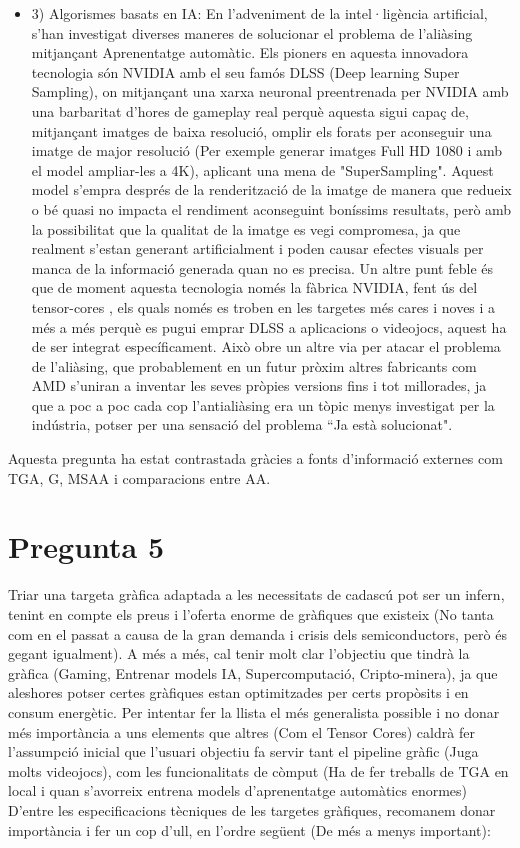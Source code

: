 \documentclass[12pt]{article}
\begin{document}
\begin{itemize}
    \item 3) Algorismes basats en IA: En l'adveniment de la intel·ligència artificial, s'han investigat diverses maneres de solucionar el problema de l'aliàsing mitjançant Aprenentatge automàtic. Els pioners en aquesta innovadora tecnologia són NVIDIA amb el seu famós DLSS\cite{nvidia_dlss} (Deep learning Super Sampling), on mitjançant una xarxa neuronal preentrenada per NVIDIA amb una barbaritat d'hores de gameplay real perquè aquesta sigui capaç de, mitjançant imatges de baixa resolució, omplir els forats per aconseguir una imatge de major resolució (Per exemple generar imatges Full HD 1080 i amb el model ampliar-les a 4K), aplicant una mena de "SuperSampling". Aquest model s'empra després de la renderització de la imatge de manera que redueix o bé quasi no impacta el rendiment aconseguint boníssims resultats, però amb la possibilitat que la qualitat de la imatge es vegi compromesa, ja que realment s'estan generant artificialment i poden causar efectes visuals per manca de la informació generada quan no es precisa. Un altre punt feble és que de moment aquesta tecnologia només la fàbrica NVIDIA, fent ús del tensor-cores , els quals només es troben en les targetes més cares i noves i a més a més perquè es pugui emprar DLSS a aplicacions o videojocs, aquest ha de ser integrat específicament. Això obre un altre via per atacar el problema de l'aliàsing, que probablement en un futur pròxim altres fabricants com AMD s'uniran a inventar les seves pròpies versions fins i tot millorades, ja que a poc a poc cada cop l'antialiàsing era un tòpic menys investigat per la indústria, potser per una sensació del problema “Ja està solucionat".
\end{itemize} 


Aquesta pregunta ha estat contrastada gràcies a fonts d'informació externes com TGA\cite{graphics_cards_slides}, G\cite{cs_upc_virtual}, MSAA \cite{msaa_overview} i comparacions entre AA\cite{anti_aliasing_digitaltrends}.

\section{Pregunta 5}
Triar una targeta gràfica adaptada a les necessitats de cadascú pot ser un infern, tenint en compte els preus i l'oferta enorme de gràfiques que existeix (No tanta com en el passat a causa de la gran demanda i crisis dels semiconductors,
però és gegant igualment). A més a més, cal tenir molt clar l'objectiu que tindrà la gràfica (Gaming, Entrenar models IA, Supercomputació, Cripto-minera), ja que aleshores potser certes gràfiques estan optimitzades per certs propòsits i en consum energètic. Per intentar fer la llista el més generalista possible i no donar més importància a uns elements que altres (Com el Tensor Cores) caldrà fer l'assumpció inicial que l'usuari objectiu fa servir tant el pipeline gràfic (Juga molts videojocs), com les funcionalitats de còmput (Ha de fer treballs de TGA en local i quan s'avorreix entrena models d'aprenentatge automàtics enormes)   D'entre les especificacions tècniques de les targetes gràfiques, recomanem donar importància i fer un cop d'ull, en l'ordre següent (De més a menys important): 
\\
\end{document}
